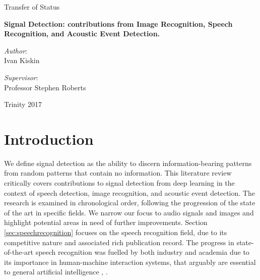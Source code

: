 \documentclass[12pt]{llncs}
\begin{document}
\begin{titlepage}
\begin{center}
		\Large
		Transfer of Status
		
		\vspace{20mm}
		
		\huge
		\textbf{Signal Detection: contributions from Image Recognition, Speech Recognition, and Acoustic Event Detection.}
	\end{center}
	
	\vspace{23mm}
	
	\begin{minipage}[t]{0.5\textwidth}
		\raggedright
		\onehalfspacing
		\large
		\textit{Author}:\\[.5\baselineskip]
		Ivan Kiskin
	\end{minipage}%
	\begin{minipage}[t]{0.5\textwidth}
		\raggedleft
		\onehalfspacing
		\large
		\textit{Supervisor}:\\[.5\baselineskip]
		Professor Stephen Roberts
		
		\vspace{5mm}
	
	\end{minipage}%
	
	\vspace{\fill}
	
	\begin{minipage}[b]{\textwidth}
		\centering
		\onehalfspacing
		\large   
		Trinity 2017\\
		
		\vspace{20mm} 
	\end{minipage}%
	
\end{titlepage}


%


%
\pagestyle{headings}  %


\section{Introduction}
We define signal detection as the ability to discern information-bearing patterns from random patterns that contain no information. 
This literature review critically covers contributions to signal detection from deep learning in the context of speech detection, image recognition, and acoustic event detection. The research is examined in chronological order, following the progression of the state of the art in specific fields. We narrow our focus to audio signals and images and highlight potential areas in need of further improvements. Section \ref{sec:speechrecognition} focuses on the speech recognition field, due to its competitive nature and associated rich publication record. The progress in state-of-the-art speech recognition was fuelled by both industry and academia due to its importance in human-machine interaction systems, that arguably are essential to general artificial intelligence \cite{rabiner1993fundamentals}, \cite{juang2005automatic}.
\end{document}
